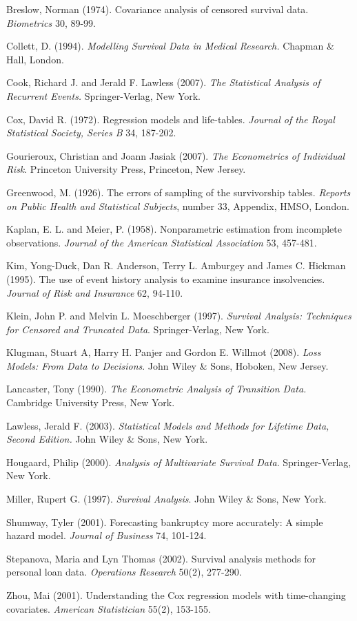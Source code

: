 \begin{multicols}{2}


Breslow, Norman (1974). Covariance analysis of censored survival
data. \textit{Biometrics} 30, 89-99.

Collett, D. (1994). \emph{Modelling Survival Data in Medical
Research.} Chapman \& Hall, London.

Cook, Richard J. and Jerald F. Lawless (2007). \textit{The
Statistical Analysis of Recurrent Events.} Springer-Verlag, New
York.

Cox, David R. (1972). Regression models and life-tables.
\emph{Journal of the Royal Statistical Society, Series B} 34,
187-202.

Gourieroux, Christian and Joann Jasiak (2007). \textit{The
Econometrics of Individual Risk}. Princeton University Press,
Princeton, New Jersey.

Greenwood, M. (1926). The errors of sampling of the survivorship
tables. \textit{Reports on Public Health and Statistical Subjects},
number 33, Appendix, HMSO, London.

Kaplan, E. L. and Meier, P. (1958). Nonparametric estimation from
incomplete observations. \emph{Journal of the American Statistical
Association} 53, 457-481.

Kim, Yong-Duck, Dan R. Anderson, Terry L. Amburgey and James C.
Hickman (1995). The use of event history analysis to examine
insurance insolvencies. \textit{Journal of Risk and Insurance} 62,
94-110.

Klein, John P. and Melvin L. Moeschberger (1997). \textit{Survival
Analysis: Techniques for Censored and Truncated Data}.
Springer-Verlag, New York.

Klugman, Stuart A, Harry H. Panjer and Gordon E. Willmot (2008).
\emph{Loss Models: From Data to Decisions}. John Wiley \& Sons,
Hoboken, New Jersey.

Lancaster, Tony (1990). \textit{The Econometric Analysis of
Transition Data.} Cambridge University Press, New York.

Lawless, Jerald F. (2003). \textit{Statistical Models and Methods
for Lifetime Data, Second Edition.} John Wiley \& Sons, New York.

Hougaard, Philip (2000). \textit{Analysis of Multivariate Survival
Data}. Springer-Verlag, New York.

Miller, Rupert G. (1997). \emph{Survival Analysis}. John Wiley \&
Sons, New York.

Shumway, Tyler (2001). Forecasting bankruptcy more accurately: A
simple hazard model. \textit{Journal of Business} 74, 101-124.

Stepanova, Maria and Lyn Thomas (2002). Survival analysis methods
for personal loan data. \emph{Operations Research} 50(2), 277-290.

Zhou, Mai (2001). Understanding the Cox regression models with
time-changing covariates. \emph{American Statistician} 55(2),
153-155.


\end{multicols}

\bigskip
